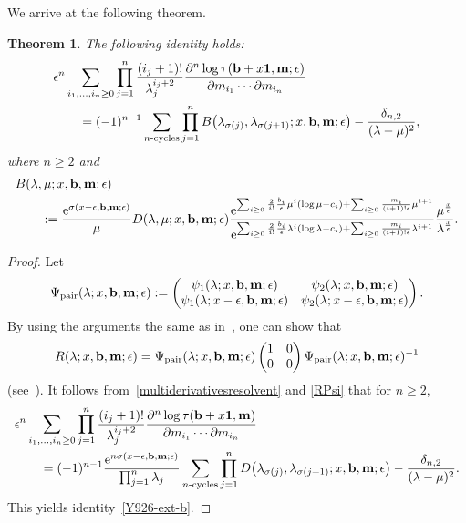 \documentclass[pdftex]{sigma}
\newcommand{\e}{\epsilon}
\newcommand{\p}{\partial}
\newcommand{\nn}{\nonumber}
\newcommand{\beq}{\begin{equation}}
\newcommand{\eeq}{\end{equation}}
\numberwithin{equation}{section}
\newtheorem{Theorem}{Theorem}[section]
\begin{document}
We arrive at the following theorem.
\begin{Theorem} The following identity holds:
\begin{align}
& \e^n \sum_{i_1,\dots,i_n\ge0}
\prod_{j=1}^n \frac{(i_j+1)!}{\lambda_j^{i_j+2}} \frac{\p^n \log \tau({\bf b}+x{\bf 1},{\bf m}; \e)}{\p m_{i_1} \cdots \p m_{i_n}}
\nn\\
&\qquad{}= (-1)^{n-1}
\sum_{\text{$n$-cycles}}
\prod_{j=1}^n B\bigl(\lambda_{\sigma(j)},\lambda_{\sigma(j+1)}; x, {\bf b}, {\bf m};\e\bigr) - \frac{\delta_{n,2}}{(\lambda-\mu)^2},\label{Y926-ext-b}
\end{align}
where $n\ge2$ and
\begin{align*}%
&B(\lambda,\mu;x, {\bf b},{\bf m};\e)\\
&\qquad{} := \frac{{\rm e}^{\sigma(x-\e, {\bf b},{\bf m};\e)}}{\mu} D(\lambda,\mu; x, {\bf b}, {\bf m};\e)
\frac
{{\rm e}^{\sum_{i\ge0} \frac2{i!} \frac{b_i}\e \mu^i (\log \mu-c_i)+\sum_{i\ge0} \frac{m_i}{(i+1)!\e} \mu^{i+1}}}
{{\rm e}^{\sum_{i\ge0} \frac2{i!} \frac{b_i}\e \lambda^{i} (\log \lambda-c_i)+\sum_{i\ge0} \frac{m_i}{(i+1)!\e} \lambda^{i+1}}}\frac{\mu^{\frac{x}\e}}{\lambda^{\frac{x}\e}}. \nn
\end{align*}
\end{Theorem}
\begin{proof}
Let
\[
\Psi_{\rm pair}(\lambda; x, {\bf b}, {\bf m};\e) :=
\begin{pmatrix} \psi_1(\lambda; x, {\bf b}, {\bf m};\e) & \psi_2(\lambda; x, {\bf b}, {\bf m};\e)
\\
\psi_1(\lambda; x-\e, {\bf b}, {\bf m};\e) & \psi_2(\lambda; x-\e, {\bf b}, {\bf m};\e)
\end{pmatrix} .
\]
By using the arguments the same as in~\cite{Y}, one can show that
\beq\label{RPsi}
R(\lambda; x, {\bf b}, {\bf m};\e) = \Psi_{\rm pair}(\lambda; x, {\bf b}, {\bf m};\e) \begin{pmatrix} 1 & 0 \\ 0 & 0\end{pmatrix}
\Psi_{\rm pair}(\lambda; x, {\bf b}, {\bf m};\e)^{-1}
\eeq
(see~\cite[the proof of Proposition~3]{Y}).
It follows from~\eqref{multiderivativesresolvent} and \eqref{RPsi} that for $n\ge2$,
\begin{align*}%
&\e^n\sum_{i_1,\dots,i_n\ge0} \prod_{j=1}^n \frac{(i_j+1)!}{\lambda_j^{i_j+2}}
\frac{\p^n \log \tau({\bf b}+x{\bf 1},{\bf m})}{\p m_{i_1} \cdots \p m_{i_n}} \\
&\qquad{}= (-1)^{n-1}
\frac{{\rm e}^{n \sigma(x-\e,{\bf b}, {\bf m};\e)}}{\prod_{j=1}^n \lambda_j} \sum_{\text{$n$-cycles}}
\prod_{j=1}^n D\bigl(\lambda_{\sigma(j)},\lambda_{\sigma(j+1)}; x, {\bf b}, {\bf m};\e\bigr) - \frac{\delta_{n,2}}{(\lambda-\mu)^2}. \nn
\end{align*}
This yields identity~\eqref{Y926-ext-b}.
\end{proof}
\end{document}
